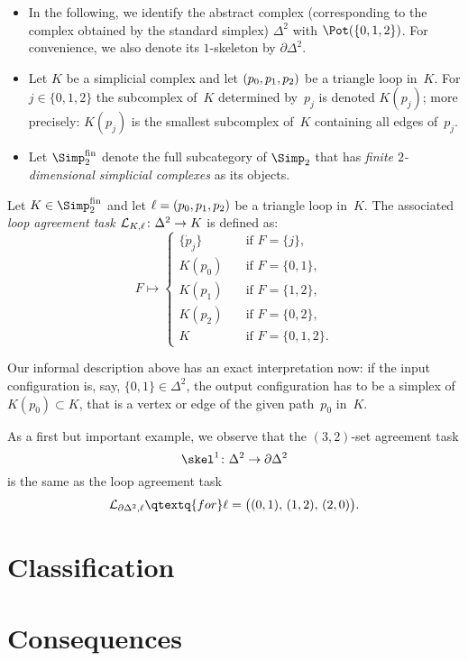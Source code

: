 \begin{thConvention}\hfill
    \begin{itemize}
        \item
            In the following, we identify the abstract complex (corresponding to
            the complex obtained by the standard simplex) $\Delta^2$ with
            $\Pot(\{0,1,2\})$. For convenience, we also denote its $1$-skeleton
            by $\partial\Delta^2$.
            
        \item
            Let $K$ be a simplicial complex and let $(p_0,p_1,p_2)$ be a triangle loop
            in~$K$. For $j\in\{0,1,2\}$ the subcomplex of~$K$ determined
            by~$p_j$ is denoted $K(p_j)$; more precisely: $K(p_j)$ is the
            smallest subcomplex of~$K$ containing all edges of~$p_j$.
            
        \item
            Let $\finSimp$ denote the full subcategory of $\Simp_2$ that has
            \emph{finite $2$-dimensional simplicial complexes} as its objects.
    \end{itemize}
\end{thConvention}

\begin{thDef}
    Let $K\in\finSimp$ and let $\ell = (p_0,p_1,p_2)$ be a triangle loop in~$K$. The
    associated \emph{loop agreement task $\mathcal{L}_{K,\ell}\colon\Delta^2 \to K$}
    is defined as:
    \[
        F \mapsto \begin{cases}
            \{\dot{p}_j\} &\quad \text{if } F = \{j\},   \\
            K(p_0)        &\quad \text{if } F = \{0,1\}, \\
            K(p_1)        &\quad \text{if } F = \{1,2\}, \\
            K(p_2)        &\quad \text{if } F = \{0,2\}, \\
            K             &\quad \text{if } F = \{0,1,2\}
        . \end{cases}
    \]
\end{thDef}

Our informal description above has an exact interpretation now: if the input
configuration is, say, $\{0,1\}\in\Delta^2$, the output configuration has to
be a simplex of $K(p_0)\subset K$, that is a vertex or edge of the given
path~$p_0$ in~$K$.

\begin{thExample}
    As a first but important example, we observe that the
    $(3,2)$-set agreement task 
    \[ \skel^1\colon\Delta^2\to\partial\Delta^2 \]
    is the same as the loop agreement task
    \[ \Loop{\partial\Delta^2,\ell}
        \qtextq{for}
        \ell = \bigl( (0,1),\, (1,2),\, (2,0) \bigr)
    . \]
\end{thExample}


\section{Classification}

\section{Consequences}
\label{ch2:sec:consequences}
